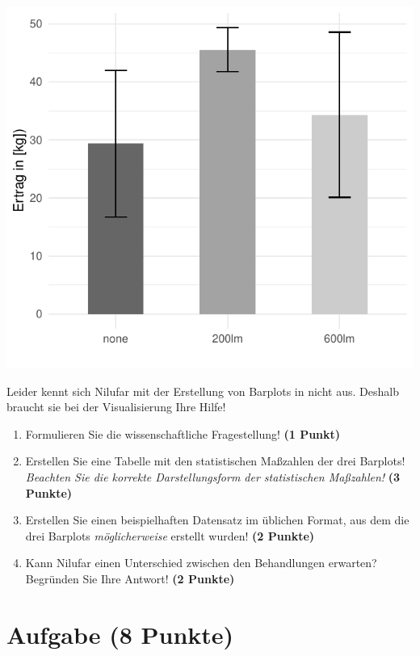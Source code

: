 \documentclass[a4paper, 9pt]{scrartcl}\usepackage[]{graphicx}\usepackage[]{xcolor}
\makeatletter
\def\maxwidth{ %
  \ifdim\Gin@nat@width>\linewidth
    \linewidth
  \else
    \Gin@nat@width
  \fi
}
\makeatother
\begin{document}
{\centering \includegraphics[width=\maxwidth]{img/barplot-02-1} 

}




Leider kennt sich Nilufar mit der Erstellung von Barplots in \Rlogo nicht aus. Deshalb braucht sie bei der Visualisierung Ihre Hilfe!

\begin{enumerate}
\item Formulieren Sie die wissenschaftliche Fragestellung! \textbf{(1 Punkt)}
\item Erstellen Sie eine Tabelle mit den statistischen Maßzahlen der drei Barplots! \textit{Beachten Sie die korrekte Darstellungsform der statistischen Maßzahlen!} \textbf{(3 Punkte)}
\item Erstellen Sie einen beispielhaften Datensatz im \Rlogo üblichen Format, aus dem die drei Barplots \textit{möglicherweise} erstellt wurden! \textbf{(2 Punkte)}
\item Kann Nilufar einen Unterschied zwischen den Behandlungen erwarten? Begründen Sie Ihre Antwort! \textbf{(2 Punkte)}
\end{enumerate} 
\clearpage

\section{Aufgabe \hfill (8 Punkte)}
\end{document}
